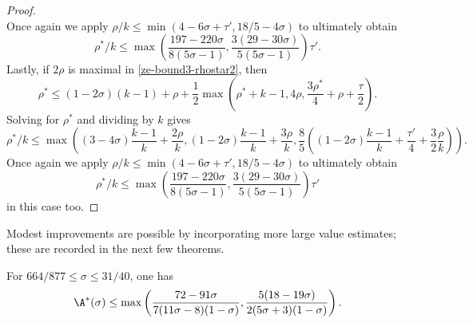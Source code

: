\begin{proof}
\[\]
Once again we apply $\rho/k \le \min(4 - 6\sigma + \tau', 18/5 - 4\sigma)$ to ultimately obtain
\[
\rho^*/k \le \max\left(\frac{197 - 220\sigma}{8(5\sigma - 1)}, \frac{3(29 - 30\sigma)}{5(5\sigma - 1)}\right)\tau'.
\]
Lastly, if $2\rho$ is maximal in \eqref{ze-bound3-rhostar2}, then
\[
\rho^* \le (1 - 2\sigma)(k - 1) + \rho + \frac{1}{2}\max(\rho^*+k - 1, 4\rho, \frac{3\rho^*}{4} + \rho+\frac{\tau}{2}).
\]
Solving for $\rho^*$ and dividing by $k$ gives
\[
\rho^*/k \le \max((3 - 4\sigma)\frac{k - 1}{k} + \frac{2\rho}{k}, (1 - 2\sigma)\frac{k - 1}{k} + \frac{3\rho}{k}, \frac{8}{5}((1 - 2\sigma)\frac{k - 1}{k} + \frac{\tau'}{4} + \frac{3}{2}\frac{\rho}{k})).
\]
Once again we apply $\rho/k \le \min(4 - 6\sigma + \tau', 18/5 - 4\sigma)$ to ultimately obtain
\[
\rho^*/k \le \max\left(\frac{197 - 220\sigma}{8(5\sigma - 1)}, \frac{3(29 - 30\sigma)}{5(5\sigma - 1)}\right)\tau'
\]
in this case too.
\end{proof}

Modest improvements are possible by incorporating more large value estimates; these are recorded in the next few theorems.

\begin{theorem}\label{imp-energy-bound4}
For $664/877 \le \sigma \le 31/40$, one has
\[
\A^*(\sigma)\le \max\left(\frac{72 - 91\sigma}{7(11\sigma - 8)(1 - \sigma)}, \frac{5(18 - 19\sigma)}{2(5\sigma + 3)(1 - \sigma)}\right).
\]
\end{theorem}
\derived
{}

